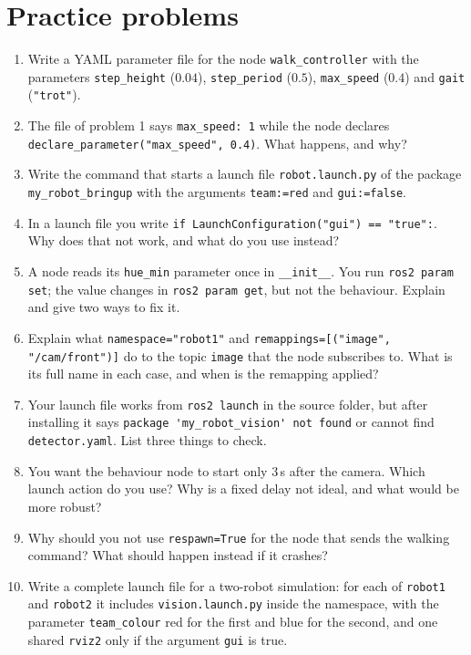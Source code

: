 \section*{Practice problems}
\begin{enumerate}[label=\textbf{\thechapter.\arabic*}]
  \item Write a YAML parameter file for the node \verb!walk_controller! with the parameters \verb!step_height! ($0.04$), \verb!step_period! ($0.5$), \verb!max_speed! ($0.4$) and \verb!gait! (\verb!"trot"!).
  \item The file of problem 1 says \verb!max_speed: 1! while the node declares \verb!declare_parameter("max_speed", 0.4)!. What happens, and why?
  \item Write the command that starts a launch file \verb!robot.launch.py! of the package \verb!my_robot_bringup! with the arguments \verb!team:=red! and \verb!gui:=false!.
  \item In a launch file you write \verb!if LaunchConfiguration("gui") == "true":!. Why does that not work, and what do you use instead?
  \item A node reads its \verb!hue_min! parameter once in \verb!__init__!. You run \verb!ros2 param set!; the value changes in \verb!ros2 param get!, but not the behaviour. Explain and give two ways to fix it.
  \item Explain what \verb!namespace="robot1"! and \verb!remappings=[("image", "/cam/front")]! do to the topic \verb!image! that the node subscribes to. What is its full name in each case, and when is the remapping applied?
  \item Your launch file works from \verb!ros2 launch! in the source folder, but after installing it says \verb!package 'my_robot_vision' not found! or cannot find \verb!detector.yaml!. List three things to check.
  \item You want the behaviour node to start only $3$\,s after the camera. Which launch action do you use? Why is a fixed delay not ideal, and what would be more robust?
  \item Why should you not use \verb!respawn=True! for the node that sends the walking command? What should happen instead if it crashes?
  \item[\textbf{\thechapter.10}$\star$] Write a complete launch file for a two-robot simulation: for each of \verb!robot1! and \verb!robot2! it includes \verb!vision.launch.py! inside the namespace, with the parameter \verb!team_colour! red for the first and blue for the second, and one shared \verb!rviz2! only if the argument \verb!gui! is true.
\end{enumerate}
